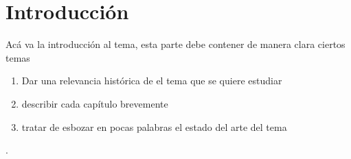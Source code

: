

\setcounter{page}{1}
\chapter{Introducción}

\medskip





Acá va la introducción al tema, esta parte debe contener de manera clara ciertos temas 

\begin{enumerate}
    \item Dar una relevancia histórica de el tema que se quiere estudiar
    \item describir cada capítulo brevemente 
    \item tratar de esbozar en pocas palabras el estado del arte del tema
\end{enumerate}




  







\medskip









.\\



